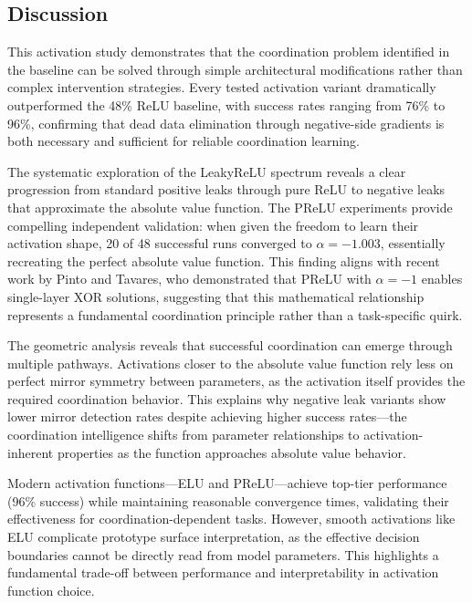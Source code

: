 




\subsection*{Discussion}

This activation study demonstrates that the coordination problem identified in the baseline can be solved through simple architectural modifications rather than complex intervention strategies. Every tested activation variant dramatically outperformed the 48\% ReLU baseline, with success rates ranging from 76\% to 96\%, confirming that dead data elimination through negative-side gradients is both necessary and sufficient for reliable coordination learning.

The systematic exploration of the LeakyReLU spectrum reveals a clear progression from standard positive leaks through pure ReLU to negative leaks that approximate the absolute value function. The PReLU experiments provide compelling independent validation: when given the freedom to learn their activation shape, 20 of 48 successful runs converged to $\alpha = -1.003$, essentially recreating the perfect absolute value function. This finding aligns with recent work by Pinto and Tavares, who demonstrated that PReLU with $\alpha = -1$ enables single-layer XOR solutions, suggesting that this mathematical relationship represents a fundamental coordination principle rather than a task-specific quirk.

The geometric analysis reveals that successful coordination can emerge through multiple pathways. Activations closer to the absolute value function rely less on perfect mirror symmetry between parameters, as the activation itself provides the required coordination behavior. This explains why negative leak variants show lower mirror detection rates despite achieving higher success rates—the coordination intelligence shifts from parameter relationships to activation-inherent properties as the function approaches absolute value behavior.

Modern activation functions—ELU and PReLU—achieve top-tier performance (96\% success) while maintaining reasonable convergence times, validating their effectiveness for coordination-dependent tasks. However, smooth activations like ELU complicate prototype surface interpretation, as the effective decision boundaries cannot be directly read from model parameters. This highlights a fundamental trade-off between performance and interpretability in activation function choice.

